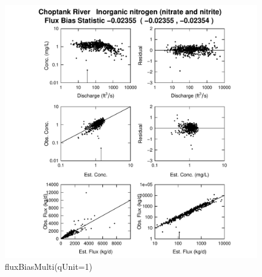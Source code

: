 \documentclass[a4paper,11pt]{article}\usepackage{graphicx, color}
\newenvironment{knitrout}{}{} %
\begin{document}
\begin{knitrout}
\color{fgcolor}\begin{figure}[]

\includegraphics[width=1\linewidth,height=1\linewidth]{figure/fluxBiasMulti} \caption[fluxBiasMulti(qUnit=1)]{fluxBiasMulti(qUnit=1)\label{fig:fluxBiasMulti}}
\end{figure}


\end{knitrout}
\end{document}
